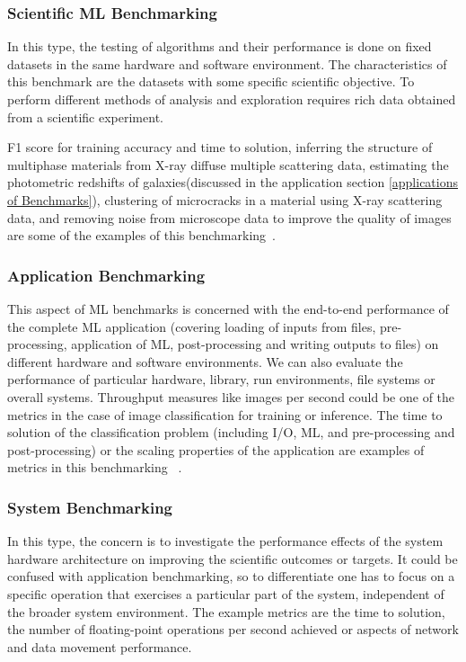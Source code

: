 \documentclass[a4paper,UKenglish,cleveref, autoref, thm-restate]{lipics-v2021}
\begin{document}
 
     \subsubsection{Scientific ML Benchmarking}
     \label{scientific ml benchmarking}
    In this type, the testing of algorithms and their performance is done on fixed datasets in the same hardware and software environment. The characteristics of this benchmark are the datasets with some specific scientific objective. To perform different methods of analysis and exploration requires rich data obtained from a scientific experiment.
     
F1 score for training accuracy and time to solution, inferring the structure of multiphase materials from X-ray diffuse multiple scattering data,  estimating the photometric redshifts of galaxies(discussed in the application section \ref{applications of Benchmarks}), clustering of microcracks in a material using X-ray scattering data, and removing noise from microscope data to improve the quality of images are some of the examples of this benchmarking~\cite{sctmlb}.
    \subsubsection{Application Benchmarking}
    \label{application benchmarking}
     
This aspect of ML benchmarks is concerned with the end-to-end performance of the complete ML application (covering loading of inputs from files, pre-processing, application of ML, post-processing and writing outputs to files) on different hardware and software environments.
We can also evaluate the performance of particular hardware, library, run environments, file systems or overall systems.
Throughput measures like images per second could be one of the metrics in the case of image classification for training or inference. The time to solution of the classification problem (including I/O, ML, and pre-processing and post-processing) or the scaling properties of the application are examples of metrics in this benchmarking ~\cite{sctmlb}.

    \subsubsection{System Benchmarking}
    \label{system benchmarking}
     In this type, the concern is to investigate the performance effects of the system hardware architecture on improving the scientific outcomes or targets. It could be confused with application benchmarking, so to differentiate one has to focus on a specific operation that exercises a particular part of the system, independent of the broader system environment.
The example metrics are the time to solution, the number of floating-point operations per second achieved or aspects of network and data movement performance.
\end{document}
